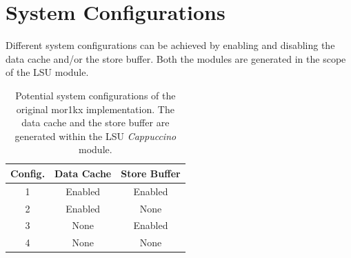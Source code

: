 \section{System Configurations}
Different system configurations can be achieved by enabling and disabling the data cache and/or the store buffer. Both the modules are generated in the scope of the LSU module.

\begin{table}[H]
	\begin{center}
		\begin{tabular}{c | c | c}
			\hline
			Config. & Data Cache & Store Buffer \\
			\hline
			\hline
		    1 & Enabled & Enabled \\
		    \hline
		    2 & Enabled & None \\
		    \hline
		    3 & None & Enabled \\
		    \hline
		    4 & None & None \\
			\hline
		\end{tabular}
	\end{center}
	\caption{Potential system configurations of the original mor1kx implementation. The data cache and the store buffer are generated within the LSU \textit{Cappuccino} module.}
	\label{wt-system-configurations}
\end{table}